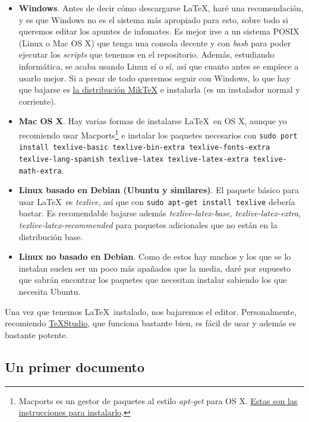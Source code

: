 \documentclass[palatino]{apuntes}
\begin{document}
\begin{itemize}
\item \textbf{Windows}. Antes de decir cómo descargarse \LaTeX, haré una recomendación, y es que Windows no es el sistema más apropiado para esto, sobre todo si queremos editar los apuntes de infomates. Es mejor irse a un sistema POSIX (Linux o Mac OS X) que tenga una consola decente y con \textit{bash} para poder ejecutar los \textit{scripts} que tenemos en el repositorio. Además, estudiando informática, se acaba usando Linux sí o sí, así que cuanto antes se empiece a usarlo mejor. Si a pesar de todo queremos seguir con Windows, lo que hay que bajarse es \href{http://miktex.org/download}{la distribución MikTeX} e instalarla (es un instalador normal y corriente).

\item \textbf{Mac OS X}. Hay varias formas de instalarse \LaTeX\ en OS X, aunque yo recomiendo usar Macports\footnote{Macports es un gestor de paquetes al estilo \textit{apt-get} para OS X. \href{https://www.macports.org/install.php}{Estas son las instrucciones para instalarlo}.} e instalar los paquetes necesarios con \texttt{sudo port install texlive-basic texlive-bin-extra texlive-fonts-extra texlive-lang-spanish texlive-latex texlive-latex-extra texlive-math-extra}.

\item \textbf{Linux basado en Debian (Ubuntu y similares)}. El paquete básico para usar \LaTeX\ es \textit{texlive}, así que con \texttt{sudo apt-get install texlive} debería bastar. Es recomendable bajarse además \textit{texlive-latex-base, texlive-latex-extra, texlive-latex-recommended} para paquetes adicionales que no están en la distribución base.

\item \textbf{Linux no basado en Debian}. Como de estos hay muchos y los que se lo instalan suelen ser un poco más apañados que la media, daré por supuesto que sabrán encontrar los paquetes que necesitan instalar sabiendo los que necesita Ubuntu.
\end{itemize}

Una vez que tenemos \LaTeX\ instalado, nos bajaremos el editor. Personalmente, recomiendo \href{http://www.texstudio.org/}{TeXStudio}, que funciona bastante bien, es fácil de usar y además es bastante potente.

\subsection{Un primer documento}
\label{sec:EstructuraDocumento}
\end{document}
